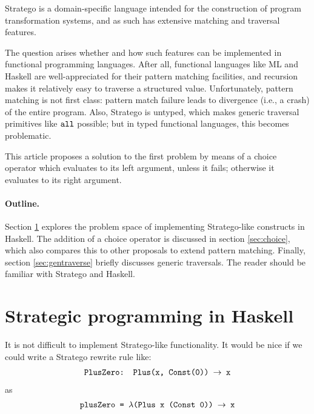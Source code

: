\documentclass[fleqn]{article}
\newcommand{\ve}[1]{\ensuremath{\text{\tt #1}}}
\newcommand{\ra}{\ensuremath{\rightarrow} }
\begin{document}
Stratego \cite{optrewritestrat} is a domain-specific language intended
for the construction of program transformation systems, and as such has
extensive matching and traversal features.

The question arises whether and how such features can be implemented
in functional programming languages.  After all, functional languages
like ML and Haskell \cite{haskell98}
are well-appreciated for their pattern matching
facilities, and recursion makes it relatively easy to traverse a
structured value.  Unfortunately, pattern matching is not first class:
pattern match failure leads to divergence (i.e., a crash) of the
entire program.  Also, Stratego is untyped, which makes generic
traversal primitives like \ve{all} possible; but in typed functional
languages, this becomes problematic.

This article proposes a solution to the first problem by means of a
choice operator which evaluates to its left argument, unless
it fails; otherwise it evaluates to its right argument.


\paragraph{Outline.}

Section \ref{sec:purehaskell} explores the problem space of
implementing Stratego-like constructs in Haskell.  The addition of a
choice operator is discussed in section \ref{sec:choice}, which also
compares this to other proposals to extend pattern matching.  Finally,
section \ref{sec:gentraverse} briefly discusses generic traversals.
The reader should be familiar with Stratego and Haskell.


\section{Strategic programming in Haskell}
\label{sec:purehaskell}

It is not difficult to implement Stratego-like functionality.  It
would be
nice if we could write a Stratego rewrite rule like:
\[
\begin{array}{l}
\ve{PlusZero: Plus(x, Const(0)) \ra x} \\
\end{array}
\]
as
\begin{equation}
\label{ex:haskellzero}
\begin{array}{l}
\ve{plusZero = $\lambda$(Plus x (Const 0)) \ra x} \\
\end{array}
\end{equation}
\end{document}
